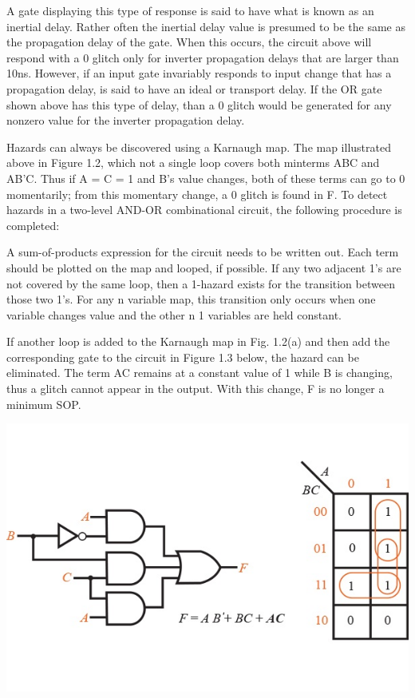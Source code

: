 \documentclass[12pt]{article}
\begin{document}
A gate displaying this type of response is said to have what is known as an inertial delay. Rather often the inertial delay value is presumed to be the same as the propagation delay of the gate. When this occurs, the circuit above will respond with a 0 glitch only for inverter propagation delays that are larger than 10ns. However, if an input gate invariably responds to input change that has a propagation delay, is said to have an ideal or transport delay. If the OR gate shown above has this type of delay, than a 0 glitch would be generated for any nonzero value for the inverter propagation delay.

Hazards can always be discovered using a Karnaugh map. The map illustrated above in Figure 1.2, which not a single loop covers both minterms ABC and AB'C. Thus if A = C = 1 and B's value changes, both of these terms can go to 0 momentarily; from this momentary change, a 0 glitch is found in F. To detect hazards in a two-level AND-OR combinational circuit, the following procedure is completed: 

A sum-of-products expression for the circuit needs to be written out.
Each term should be plotted on the map and looped, if possible.
If any two adjacent 1's are not covered by the same loop, then a 1-hazard exists for the transition between those two 1's. For any n variable map, this transition only occurs when one variable changes value and the other n  1 variables are held constant. 

If another loop is added to the Karnaugh map in Fig. 1.2(a) and then add the corresponding gate to the circuit in Figure 1.3 below, the hazard can be eliminated. The term AC remains at a constant value of 1 while B is changing, thus a glitch cannot appear in the output. With this change, F is no longer a minimum SOP. 



\begin{center}
	\includegraphics[scale=0.8]{./karnaugh-map-1-3.jpg}
\end{center}
\end{document}
